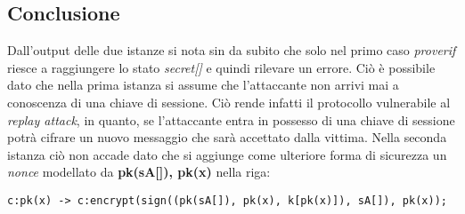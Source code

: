 \documentclass[11pt]{article}
\begin{document}
\subsection{Conclusione}
\label{sec:orgd208fca}
Dall'output delle due istanze si nota sin da subito che solo nel primo caso \emph{proverif} riesce a raggiungere lo stato \emph{secret[]} e quindi rilevare un errore.
Ciò è possibile dato che nella prima istanza si assume che l'attaccante non arrivi mai a conoscenza di una chiave di sessione. Ciò rende infatti il protocollo vulnerabile al \emph{replay attack}, in quanto, se l'attaccante entra in possesso di una chiave di sessione potrà cifrare un nuovo messaggio che sarà accettato dalla vittima.
Nella seconda istanza ciò non accade dato che si aggiunge come ulteriore forma di sicurezza un \emph{nonce} modellato da \textbf{pk(sA[]), pk(x)} nella riga:
\begin{verbatim}
c:pk(x) -> c:encrypt(sign((pk(sA[]), pk(x), k[pk(x)]), sA[]), pk(x));
\end{verbatim}
\end{document}

